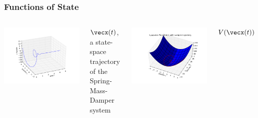 \documentclass[12pt]{beamer}
\begin{document}
\begin{frame}
\frametitle{Functions of State}

\begin{columns}
\centering
\includegraphics[width=\linewidth]{pic/smd_trajectory}

$\vecx(t)$, a state-space trajectory of the Spring-Mass-Damper system

\centering
\includegraphics[width=1\linewidth]{pic/smd_Vtraj}

$V(\vecx(t))$

\end{columns}

\end{frame}
\end{document}
